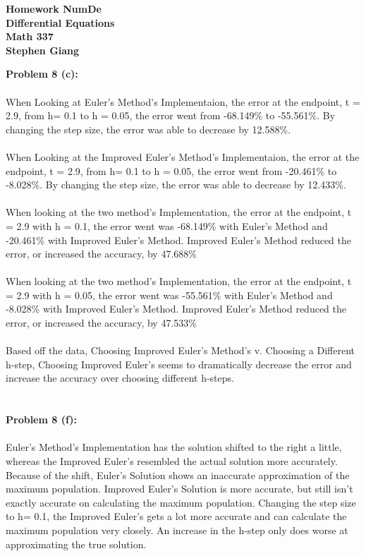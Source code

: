 \documentclass[12pt]{article}
\begin{document}
	
	\begin{center}
		\textbf{Homework NumDe} \\
		\textbf{Differential Equations} \\
		\textbf{Math 337} \\
		\textbf{Stephen Giang} \\
	\end{center}

\noindent \textbf{Problem 8 (c): } 
\\ \\
When Looking at Euler's Method's Implementaion, the error at the endpoint, t = 2.9, from h= 0.1 to h = 0.05, the error went from -68.149\% to -55.561\%.  By changing the step size, the error was able to decrease by 12.588\%. 
\\ \\
When Looking at the Improved Euler's Method's Implementaion, the error at the endpoint, t = 2.9, from h= 0.1 to h = 0.05, the error went from -20.461\% to -8.028\%.  By changing the step size, the error was able to decrease by 12.433\%. 
\\ \\
When looking at the two method's Implementation, the error at the endpoint, t = 2.9 with h = 0.1, the error went was -68.149\% with Euler's Method and -20.461\% with Improved Euler's Method. Improved Euler's Method reduced the error, or increased the accuracy, by 47.688\%    
\\ \\ 
When looking at the two method's Implementation, the error at the endpoint, t = 2.9 with h = 0.05, the error went was -55.561\% with Euler's Method and -8.028\% with Improved Euler's Method. Improved Euler's Method reduced the error, or increased the accuracy, by 47.533\%  
\\ \\
Based off the data, Choosing Improved Euler's Method's v. Choosing a Different h-step, Choosing Improved Euler's seems to dramatically decrease the error and increase the accuracy over choosing different h-steps.
\\ \\ \\
\noindent \textbf{Problem 8 (f): }
\\ \\
Euler's Method's Implementation has the solution shifted to the right a little, whereas the Improved Euler's resembled the actual solution more accurately.  Because of the shift, Euler's Solution shows an inaccurate approximation of the maximum population. Improved Euler's Solution is more accurate, but still isn't exactly accurate on calculating the maximum population. Changing the step size to h= 0.1, the Improved Euler's gets a lot more accurate and can calculate the maximum population very closely. An increase in the h-step only does worse at approximating the true solution.
\end{document}
